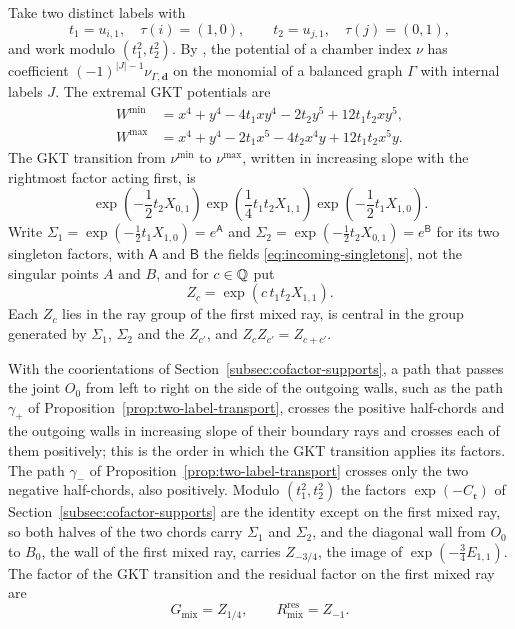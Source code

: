 Take two distinct labels with
\[
 t_1=u_{i,1},\quad\tau(i)=(1,0),
 \qquad
 t_2=u_{j,1},\quad\tau(j)=(0,1),
\]
and work modulo $(t_1^2,t_2^2)$.  By \cite[Def.~4.6]{grossetal2022open}, the
potential of a chamber index $\nu$ has coefficient
$(-1)^{|J|-1}\nu_{\Gamma,\mathbf d}$ on the monomial of a balanced graph
$\Gamma$ with internal labels $J$.  The extremal GKT potentials are
\begin{equation}\label{eq:mixed-potentials}
\begin{aligned}
 W^{\min}
 &=x^4+y^4-4t_1xy^4-2t_2y^5+12t_1t_2xy^5,\\
 W^{\max}
 &=x^4+y^4-2t_1x^5-4t_2x^4y+12t_1t_2x^5y.
\end{aligned}
\end{equation}
The GKT transition from $\nu^{\min}$ to $\nu^{\max}$, written in increasing
slope with the rightmost factor acting first, is
\begin{equation}\label{eq:mixed-GKT-transition}
 \exp\!\left(-\frac12t_2X_{0,1}\right)
 \exp\!\left(\frac14t_1t_2X_{1,1}\right)
 \exp\!\left(-\frac12t_1X_{1,0}\right).
\end{equation}
Write $\Sigma_1=\exp(-\frac12t_1X_{1,0})=e^{\mathsf A}$ and
$\Sigma_2=\exp(-\frac12t_2X_{0,1})=e^{\mathsf B}$ for its two singleton
factors, with $\mathsf A$ and $\mathsf B$ the fields
\eqref{eq:incoming-singletons}, not the singular points $A$ and $B$, and for
$c\in\mathbb Q$ put
\begin{equation}\label{eq:mixed-total-factor}
 Z_c=\exp\!\left(c\,t_1t_2X_{1,1}\right).
\end{equation}
Each $Z_c$ lies in the ray group of the first mixed ray, is central in the group
generated by $\Sigma_1$, $\Sigma_2$ and the $Z_{c'}$, and $Z_cZ_{c'}=Z_{c+c'}$.

With the coorientations of Section~\ref{subsec:cofactor-supports}, a path
that passes the joint $O_0$ from left to right on the side of the outgoing
walls, such as the
path $\gamma_+$ of Proposition~\ref{prop:two-label-transport}, crosses the
positive half-chords and the outgoing walls in increasing slope of their
boundary rays and
crosses each of them positively; this is the order in which the GKT
transition applies its factors.  The path $\gamma_-$ of
Proposition~\ref{prop:two-label-transport} crosses only the two negative
half-chords, also positively.  Modulo $(t_1^2,t_2^2)$ the factors
$\exp(-C_{\mathfrak r})$ of Section~\ref{subsec:cofactor-supports} are the
identity except on the first mixed ray, so both halves of the two chords
carry $\Sigma_1$ and $\Sigma_2$, and the diagonal wall from $O_0$ to $B_0$,
the wall of the first mixed ray, carries $Z_{-3/4}$, the image of
$\exp(-\frac34E_{1,1})$.
The factor of the GKT transition and the residual factor on the first
mixed ray are
\begin{equation}\label{eq:mixed-decoration}
 G_{\mathrm{mix}}=Z_{1/4},
 \qquad
 R^{\mathrm{res}}_{\mathrm{mix}}=Z_{-1}.
\end{equation}

